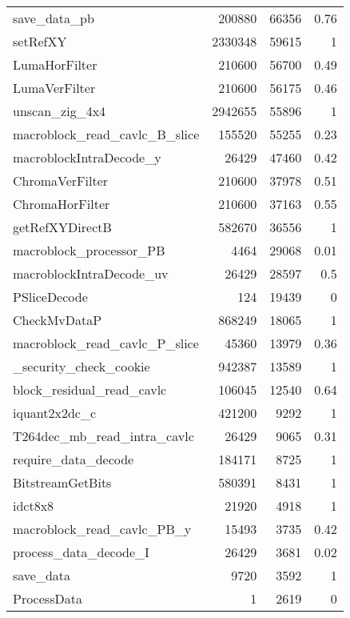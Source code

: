 \begin{longtable}[\textwidth]{lrrr}
    save\_data\_pb				&	200880	&	66356	&	0.76	\\ \rowcolor{gray!15}
    setRefXY					&	2330348	&	59615	&	1		\\
    LumaHorFilter				&	210600	&	56700	&	0.49	\\ \rowcolor{gray!15}
    LumaVerFilter				&	210600	&	56175	&	0.46	\\
    unscan\_zig\_4x4			&	2942655	&	55896	&	1		\\ \rowcolor{gray!15}
    macroblock\_read\_cavlc\_B\_slice
    							&	155520	&	55255	&	0.23	\\
    macroblockIntraDecode\_y	&	26429	&	47460	&	0.42	\\ \rowcolor{gray!15}
    ChromaVerFilter			&	210600	&	37978	&	0.51	\\
    ChromaHorFilter			&	210600	&	37163	&	0.55	\\ \rowcolor{gray!15}
    getRefXYDirectB			&	582670	&	36556	&	1		\\
    macroblock\_processor\_PB	&	4464 	&	29068	&	0.01	\\ \rowcolor{gray!15}
    macroblockIntraDecode\_uv	&	26429	&	28597	&	0.5		\\
    PSliceDecode				&	124  	&	19439	&	0		\\ \rowcolor{gray!15}
    CheckMvDataP				&	868249	&	18065	&	1		\\
    macroblock\_read\_cavlc\_P\_slice	
    							&	45360	&	13979	&	0.36	\\ \rowcolor{gray!15}
    \_security\_check\_cookie	&	942387	&	13589	&	1		\\
    block\_residual\_read\_cavlc	
    							&	106045	&	12540	&	0.64	\\ \rowcolor{gray!15}
    iquant2x2dc\_c				&	421200	&	9292 	&	1		\\
    T264dec\_mb\_read\_intra\_cavlc	
    							&	26429	&	9065 	&	0.31	\\ \rowcolor{gray!15}
    require\_data\_decode		&	184171	&	8725 	&	1		\\
    BitstreamGetBits			&	580391	&	8431 	&	1		\\ \rowcolor{gray!15}
    idct8x8						&	21920	&	4918 	&	1		\\
    macroblock\_read\_cavlc\_PB\_y	
    							&	15493	&	3735 	&	0.42	\\ \rowcolor{gray!15}
    process\_data\_decode\_I	&	26429	&	3681 	&	0.02	\\
    save\_data					&	9720 	&	3592 	&	1		\\ \rowcolor{gray!15}
    ProcessData				&	1    	&	2619 	&	0		\\

\end{longtable}
